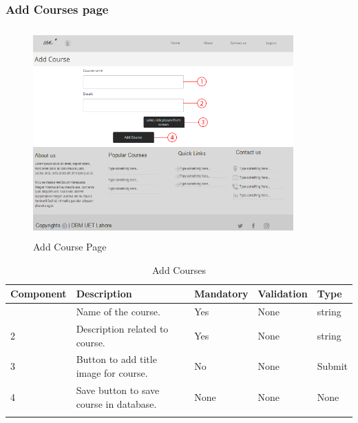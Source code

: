 \documentclass[12pt]{article}
\begin{document}
\subsubsection{Add Courses page}
\begin{figure}[h]
  \centering
  \includegraphics[width=10cm, height=8cm]{AddNewCourse}
  \caption{Add Course Page}
\end{figure}

\begin{longtable}{|>{\raggedright\arraybackslash}p{2.5cm}|>{\raggedright\arraybackslash}p{2.5cm}|>{\raggedright\arraybackslash}p{2.5cm}|>{\raggedright\arraybackslash}p{2cm}|>{\raggedright\arraybackslash}p{2cm}|}
\hline
\textbf{Component} & \textbf{Description} & \textbf{Mandatory} & \textbf{Validation} & \textbf{Type}\\
\hline
1 &
Name of the course. &
Yes &
None &
string\\
\hline

2 &
Description related to course. &
Yes &
None &
string \\
\hline

3 &
Button to add title image for course. &
No &
None &
Submit \\
\hline

4 &
Save button to save course in database. &
None &
None &
None \\
\hline

\caption{Add Courses}
\end{longtable}
\end{document}
